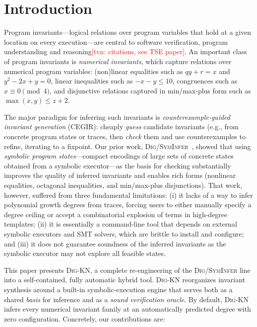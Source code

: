 \documentclass[runningheads]{llncs}
\newcommand{\tool}{\textsc{Dig-KN}\xspace}
\newcommand{\digold}{\textsc{Dig/SymInfer}\xspace}
\newcommand{\tvn}[1]{\textcolor{red}{[tvn: #1]}}
\begin{document}
\section{Introduction}
\label{sec:intro}

Program invariants---logical relations over program variables that hold at a
given location on every execution---are central to software verification,
program understanding and reasoning\tvn{citations, see TSE paper}.
An important class of program invariants is \emph{numerical invariants}, which capture relations over numerical program variables: 
(non)linear equalities such as $q y + r = x$ and $y^2 - 2x + y = 0$, linear inequalities such as
$-x-y\le 10$, congruences such as $x \equiv 0 \pmod 4$, and disjunctive
relations captured in min/max-plus form such as $\max(x,y)\le z{+}2$.

The major paradigm for inferring such invariants is
\emph{counterexample-guided invariant generation} (CEGIR): cheaply
\emph{guess} candidate invariants (e.g., from concrete program states or traces, then
\emph{check} them and use counterexamples to refine, iterating to a fixpoint.
Our prior work, \digold~\cite{nguyen2021using,nguyen2017syminfer}, showed that
using \emph{symbolic program states}---compact encodings of large sets of
concrete states obtained from a symbolic executor---as the basis for checking
substantially improves the quality of inferred invariants and enables rich
forms (nonlinear equalities, octagonal inequalities, and min/max-plus
disjunctions).
That work, however, suffered from three fundamental limitations:
(i) it lacks of a way to infer polynomial growth degrees from traces, forcing users to either manually specify a degree ceiling or accept a combinatorial explosion of terms in high-degree templates; (ii) it is essentially a command-line tool that depends on external symbolic executors and SMT solvers, which are brittle to install and configure; and (iii) it does not guarantee soundness of the inferred invariants as the symbolic executor may not explore all feasible states.

This paper presents \tool{}, a complete re-engineering of the \digold{} line into a self-contained, fully automatic hybrid tool.  \tool{} reorganizes invariant synthesis around a built-in symbolic-execution engine that serves both as a shared \emph{basis} for inference and as a \emph{sound verification oracle}.  By default, \tool{} infers every numerical invariant family at an automatically predicted degree with zero configuration.  Concretely, our contributions are:
\end{document}
